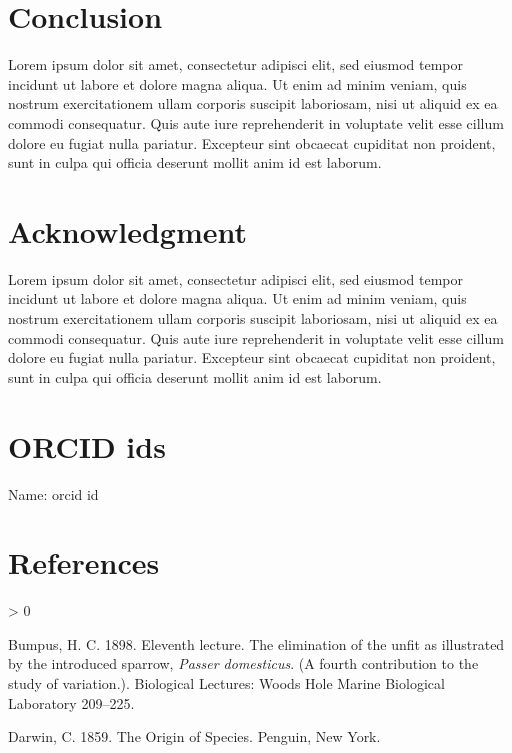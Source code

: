 \documentclass[
  12pt,
]{article}
\newlength{\cslhangindent}
\newenvironment{CSLReferences}[2] %
 {%
  \setlength{\parindent}{0pt}
  \ifodd #1 \everypar{\setlength{\hangindent}{\cslhangindent}}\ignorespaces\fi
  \ifnum #2 > 0
  \setlength{\parskip}{#2\baselineskip}
  \fi
 }%
 {}
\begin{document}
\hypertarget{conclusion}{%
\section{Conclusion}\label{conclusion}}

Lorem ipsum dolor sit amet, consectetur adipisci elit, sed eiusmod tempor incidunt ut labore et dolore magna aliqua. Ut enim ad minim veniam, quis nostrum exercitationem ullam corporis suscipit laboriosam, nisi ut aliquid ex ea commodi consequatur. Quis aute iure reprehenderit in voluptate velit esse cillum dolore eu fugiat nulla pariatur. Excepteur sint obcaecat cupiditat non proident, sunt in culpa qui officia deserunt mollit anim id est laborum.

\pagebreak

\hypertarget{acknowledgment}{%
\section*{Acknowledgment}\label{acknowledgment}}

Lorem ipsum dolor sit amet, consectetur adipisci elit, sed eiusmod tempor incidunt ut labore et dolore magna aliqua. Ut enim ad minim veniam, quis nostrum exercitationem ullam corporis suscipit laboriosam, nisi ut aliquid ex ea commodi consequatur. Quis aute iure reprehenderit in voluptate velit esse cillum dolore eu fugiat nulla pariatur. Excepteur sint obcaecat cupiditat non proident, sunt in culpa qui officia deserunt mollit anim id est laborum.

\hypertarget{orcid-ids}{%
\section*{ORCID ids}\label{orcid-ids}}

Name: orcid id

\pagebreak

\hypertarget{references}{%
\section*{References}\label{references}}

\hypertarget{refs}{}
\begin{CSLReferences}{1}{0}
\leavevmode\hypertarget{ref-Bumpus1898}{}%
Bumpus, H. C. 1898. {Eleventh lecture. The elimination of the unfit as illustrated by the introduced sparrow, {\emph{Passer domesticus}}. (A fourth contribution to the study of variation.)}. Biological Lectures: Woods Hole Marine Biological Laboratory 209--225.

\leavevmode\hypertarget{ref-Darwin1859}{}%
Darwin, C. 1859. {The Origin of Species}. Penguin, New York.

\end{CSLReferences}
\end{document}
